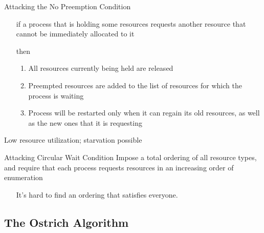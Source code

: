 \begin{frame}
  \begin{block}{Attacking the No Preemption Condition}
    \begin{itemize}
    \item[if] a process that is holding some resources requests another resource that
      cannot be immediately allocated to it
    \item[then]
      \begin{enumerate}
      \item All resources currently being held are released
      \item Preempted resources are added to the list of resources for which the process
        is waiting
      \item Process will be restarted only when it can regain its old resources, as well
        as the new ones that it is requesting
      \end{enumerate}
    \end{itemize}
  \end{block}
  Low resource utilization; starvation possible
\end{frame}

\begin{frame}
  \begin{block}{Attacking Circular Wait Condition}
    Impose a total ordering of all resource types, and require that each process
    requests resources in an increasing order of enumeration 
  \end{block}
  \begin{center}
  \end{center}
  \begin{itemize}
    \item[] It's hard to find an ordering that satisfies everyone.
  \end{itemize}
\end{frame}

\subsection{The Ostrich Algorithm}
\label{sec:ostrich-algorithm}

